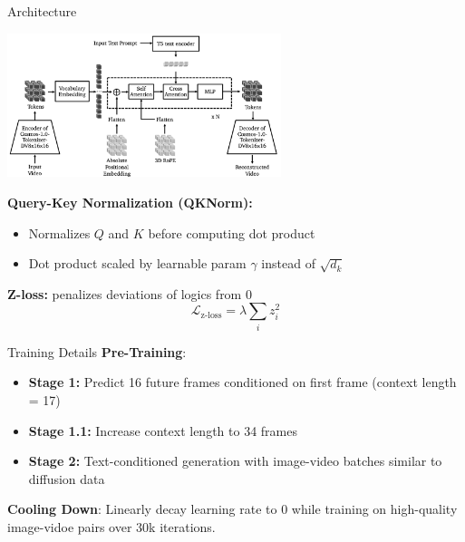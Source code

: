 \documentclass{beamer}
\begin{document}
\begin{frame}{Architecture}
	\begin{center}
            \includegraphics[width=0.6\textwidth]{./img/auto_arch.png}
	\end{center}
    \textbf{Query-Key Normalization (QKNorm):} 
    \begin{itemize}[label=-]
        \item Normalizes $Q$ and $K$ before computing dot product
        \item Dot product scaled by learnable param $\gamma$ instead of $\sqrt{d_k}$\newline
    \end{itemize}
    \textbf{Z-loss:} penalizes deviations of logics from 0
    \[\mathcal{L}_{\text{z-loss}} = \lambda \sum_i z_i^2\]


\end{frame}

\begin{frame}{Training Details}
    \textbf{Pre-Training}:
    \begin{itemize}[label=-]
        \item \textbf{Stage 1:} Predict 16 future frames conditioned on first frame (context length = 17)
        \item \textbf{Stage 1.1:} Increase context length to 34 frames
        \item \textbf{Stage 2:} Text-conditioned generation with image-video batches similar to diffusion data 
    \end{itemize}
    \textbf{Cooling Down}: Linearly decay learning rate to 0 while training on high-quality image-vidoe pairs over 30k iterations.

\end{frame}
\end{document}
